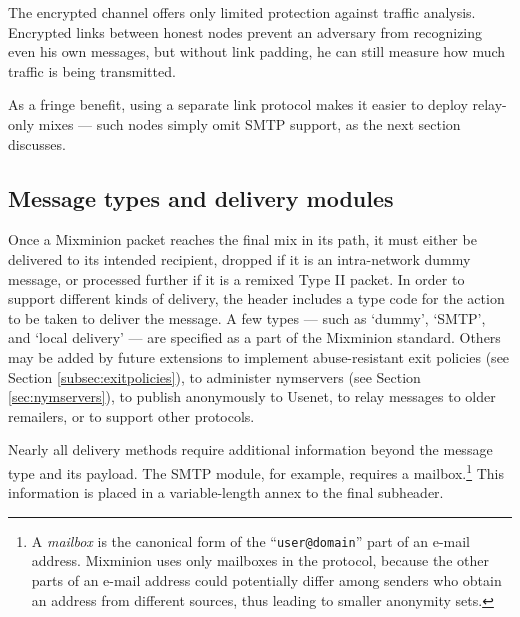 \documentclass[final,inpress,inline]{ieee}
\begin{document}
The encrypted channel offers only limited protection against traffic
analysis. Encrypted links between honest nodes prevent an adversary
from recognizing even his own messages, but without link padding, he
can still measure how much traffic is being transmitted.

As a fringe benefit, using a separate link protocol makes it
easier to deploy relay-only mixes --- such nodes simply omit SMTP
support, as the next section discusses.  

\subsection{Message types and delivery modules}
\label{subsec:delivery-modules}


Once a Mixminion packet reaches the final mix in its path, it must
either be delivered to its intended recipient, dropped if it is an
intra-network dummy message, or processed further if it is a remixed
Type II packet. In order to support different kinds of
delivery, the header includes a type code for the action to be taken
to deliver the message.  A few types --- such as `dummy', `SMTP', and
`local delivery' --- are specified as a part of the Mixminion
standard.  Others may be added by future extensions to
implement abuse-resistant exit policies (see Section
\ref{subsec:exitpolicies}), to administer nymservers (see Section
\ref{sec:nymservers}), to publish anonymously to Usenet, to relay
messages to older remailers, or to support other protocols.  

Nearly all delivery methods require additional information beyond the
message type and its payload.  The SMTP module, for example, requires
a mailbox.\footnote{A {\it mailbox} is the canonical form of the
``{\tt user@domain}'' part of an e-mail address. Mixminion uses only
mailboxes in the protocol, because the other parts
of an e-mail address could potentially differ among senders who
obtain an address from different sources, thus leading to smaller
anonymity sets.}
This information is placed
in a variable-length annex to the final subheader.
\end{document}
